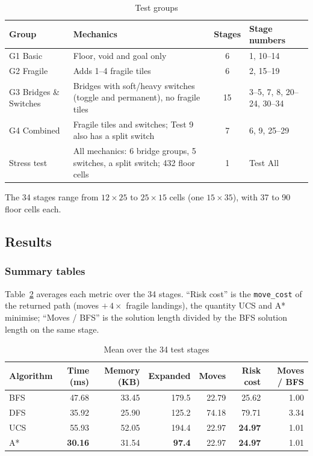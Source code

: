\begin{table}[H]
\centering
\caption{Test groups}
\label{tab:groups}
\begin{tabularx}{\linewidth}{lXcl}
\toprule
\textbf{Group} & \textbf{Mechanics} & \textbf{Stages} & \textbf{Stage numbers} \\
\midrule
G1 Basic & Floor, void and goal only & 6 & 1, 10--14 \\
G2 Fragile & Adds 1--4 fragile tiles & 6 & 2, 15--19 \\
G3 Bridges \& Switches & Bridges with soft/heavy switches (toggle and permanent), no fragile tiles & 15 & 3--5, 7, 8, 20--24, 30--34 \\
G4 Combined & Fragile tiles and switches; Test 9 also has a split switch & 7 & 6, 9, 25--29 \\
Stress test & All mechanics: 6 bridge groups, 5 switches, a split switch; 432 floor cells & 1 & Test All \\
\bottomrule
\end{tabularx}
\end{table}

The 34 stages range from $12\times25$ to $25\times15$ cells (one $15\times35$), with 37 to 90
floor cells each.

\subsection{Results}

\subsubsection{Summary tables}

Table~\ref{tab:overall} averages each metric over the 34 stages. ``Risk cost'' is the
\texttt{move\_cost} of the returned path (moves $+\,4\times$ fragile landings), the quantity UCS and
A* minimise; ``Moves / BFS'' is the solution length divided by the BFS solution length on the same
stage.

\begin{table}[H]
\centering
\caption{Mean over the 34 test stages}
\label{tab:overall}
\small\setlength{\tabcolsep}{4pt}
\begin{tabular}{lrrrrrr}
\toprule
\textbf{Algorithm} & \textbf{Time (ms)} & \textbf{Memory (KB)} & \textbf{Expanded} & \textbf{Moves} & \textbf{Risk cost} & \textbf{Moves / BFS} \\
\midrule
BFS & 47.68 & 33.45 & 179.5 & 22.79 & 25.62 & 1.00 \\
DFS & 35.92 & 25.90 & 125.2 & 74.18 & 79.71 & 3.34 \\
UCS & 55.93 & 52.05 & 194.4 & 22.97 & \textbf{24.97} & 1.01 \\
A*  & \textbf{30.16} & 31.54 & \textbf{97.4} & 22.97 & \textbf{24.97} & 1.01 \\
\bottomrule
\end{tabular}
\end{table}


